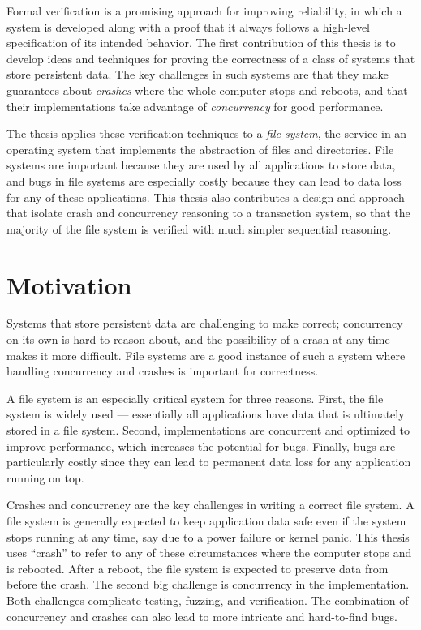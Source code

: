 Formal verification is a promising approach for improving reliability, in which
a system is developed along with a proof that it always follows a high-level
specification of its intended behavior. The first contribution of this
thesis is to develop ideas and techniques for proving the correctness of a class of
systems that store persistent data. The key challenges in such systems are that
they make guarantees about \emph{crashes} where the whole computer stops and
reboots, and that their implementations take advantage of \emph{concurrency} for
good performance.

The thesis applies these verification techniques to a \emph{file system},
the service in an operating system that implements the abstraction of files and
directories. File systems are important because they are used by all
applications to store data, and bugs in file systems are especially costly
because they can lead to data loss for any of these applications. This thesis
also contributes a design and approach that isolate crash and concurrency
reasoning to a transaction system, so that the majority of the file system is
verified with much simpler sequential reasoning.

\section{Motivation}
\label{sec:intro:motivation}

Systems that store persistent data are challenging to make correct; concurrency
on its own is hard to reason about, and the possibility of a crash at any time
makes it more difficult. File systems are a good instance of such a system where
handling concurrency and crashes is important for correctness.

A file system is an especially critical system for
three reasons. First, the file system is widely used --- essentially all applications have
data that is ultimately stored in a file system. Second, implementations are
concurrent and optimized to improve performance, which increases the potential
for bugs. Finally, bugs are particularly costly since they can lead to permanent
data loss for any application running on top.

Crashes and
concurrency are the key challenges in writing a correct file system.
A file system is generally expected to keep application data safe
even if the system stops running at any time, say due to a power failure or
kernel panic. This thesis uses ``crash'' to refer to any of these circumstances
where the computer stops and is rebooted. After a reboot, the file system is
expected to preserve data from before the crash. The second big challenge is
concurrency in the implementation. Both challenges complicate testing, fuzzing,
and verification. The combination of concurrency and crashes can also lead to more
intricate and hard-to-find bugs.


